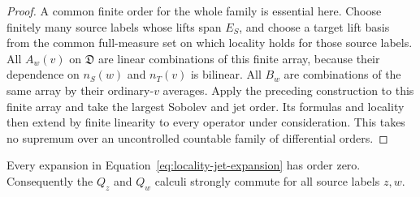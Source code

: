 \begin{proof}
A common finite order for the whole family is essential here. Choose
finitely many source labels whose lifts span $E_S$, and choose a target
lift basis from the common full-measure set on which locality holds for
those source labels. All $A_w(v)$ on $\mathfrak D$ are linear combinations
of this finite array, because their dependence on $n_S(w)$ and $n_T(v)$
is bilinear. All $B_w$ are combinations of the same array by their
ordinary-$v$ averages. Apply the preceding construction to this finite
array and take the largest Sobolev and jet order. Its formulas and
locality then extend by finite linearity to every operator under
consideration. This takes no supremum over an uncontrolled countable
family of differential orders.
\end{proof}

\begin{lemma}
\label{lem:locality-symbols}
Every expansion in Equation~\eqref{eq:locality-jet-expansion} has
order zero.  Consequently the $Q_z$ and $Q_w$ calculi strongly
commute for all source labels $z,w$.
\end{lemma}

